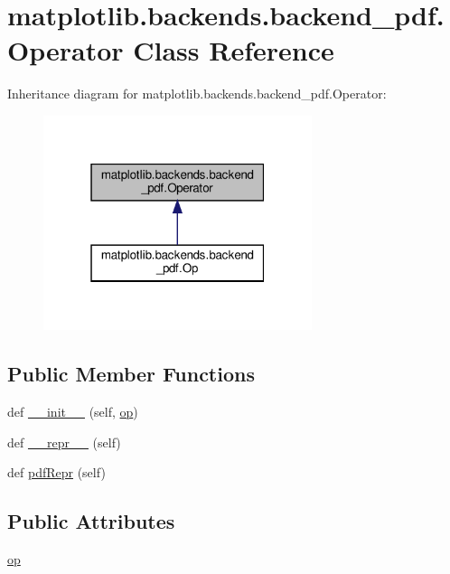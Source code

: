 \hypertarget{classmatplotlib_1_1backends_1_1backend__pdf_1_1Operator}{}\section{matplotlib.\+backends.\+backend\+\_\+pdf.\+Operator Class Reference}
\label{classmatplotlib_1_1backends_1_1backend__pdf_1_1Operator}


Inheritance diagram for matplotlib.\+backends.\+backend\+\_\+pdf.\+Operator\+:
\nopagebreak
\begin{figure}[H]
\begin{center}
\leavevmode
\includegraphics[width=223pt]{classmatplotlib_1_1backends_1_1backend__pdf_1_1Operator__inherit__graph}
\end{center}
\end{figure}
\subsection*{Public Member Functions}
\begin{DoxyCompactItemize}
\item 
def \hyperlink{classmatplotlib_1_1backends_1_1backend__pdf_1_1Operator_ad7fd4e8eedb78c3d3dbd2063f52372bd}{\+\_\+\+\_\+init\+\_\+\+\_\+} (self, \hyperlink{classmatplotlib_1_1backends_1_1backend__pdf_1_1Operator_a8c8222c629a98cb2e62124587f8581a8}{op})
\item 
def \hyperlink{classmatplotlib_1_1backends_1_1backend__pdf_1_1Operator_ab1849025b6b6b96e39cdf884132cb309}{\+\_\+\+\_\+repr\+\_\+\+\_\+} (self)
\item 
def \hyperlink{classmatplotlib_1_1backends_1_1backend__pdf_1_1Operator_a56509ed1ec71c2d9ff7ea0d46a872fc3}{pdf\+Repr} (self)
\end{DoxyCompactItemize}
\subsection*{Public Attributes}
\begin{DoxyCompactItemize}
\item 
\hyperlink{classmatplotlib_1_1backends_1_1backend__pdf_1_1Operator_a8c8222c629a98cb2e62124587f8581a8}{op}
\end{DoxyCompactItemize}


